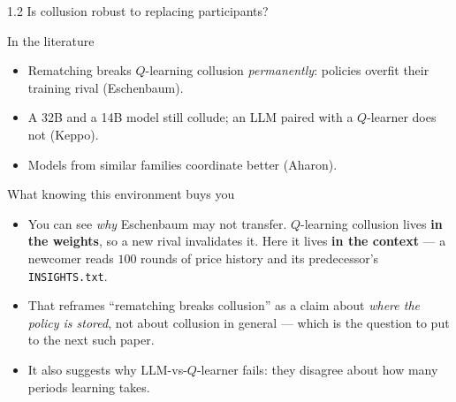 \documentclass[aspectratio=169,9pt]{beamer}
\newcommand{\orange}[1]{\textcolor{AmazonOrange}{\textbf{#1}}}
\newcommand{\blue}[1]{\textcolor{densityblue}{\textbf{#1}}}
\begin{document}
\begin{frame}{1.2 Is collusion robust to replacing participants?}
\begin{block}{In the literature}
\begin{itemize}
    \item Rematching breaks $Q$-learning collusion \textit{permanently}: policies overfit their training rival
    (Eschenbaum).
    \item A 32B and a 14B model still collude; an LLM paired with a $Q$-learner does not (Keppo).
    \item Models from similar families coordinate better (Aharon).
\end{itemize}
\end{block}
\pause
\vspace{0.1cm}
\begin{block}{What knowing this environment buys you}
\begin{itemize}
    \item You can see \textit{why} Eschenbaum may not transfer. $Q$-learning collusion lives \orange{in the
    weights}, so a new rival invalidates it. Here it lives \blue{in the context} --- a newcomer reads $100$
    rounds of price history and its predecessor's \texttt{INSIGHTS.txt}.
    \item That reframes ``rematching breaks collusion'' as a claim about \textit{where the policy is stored},
    not about collusion in general --- which is the question to put to the next such paper.
    \item It also suggests why LLM-vs-$Q$-learner fails: they disagree about how many periods learning takes.
\end{itemize}
\end{block}
\end{frame}
\end{document}
